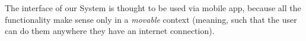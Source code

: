 The interface of our System is thought to be used via mobile app, because all the functionality make sense only in a \textit{movable} context (meaning, such that the user can do them anywhere they have an internet connection).